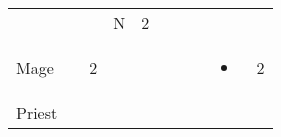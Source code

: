 \documentclass[12pt]{article}
\begin{document}
\begin{longtable}[]{@{}llllllllll@{}}
\begin{minipage}[t]{0.06\columnwidth}
\strut\end{minipage} &
\begin{minipage}[t]{0.06\columnwidth}\raggedright\strut
\strut\end{minipage} &
\begin{minipage}[t]{0.06\columnwidth}\raggedright\strut
\strut\end{minipage} &
\begin{minipage}[t]{0.07\columnwidth}\raggedright\strut
N
\strut\end{minipage} &
\begin{minipage}[t]{0.08\columnwidth}\raggedright\strut
2
\strut\end{minipage}\tabularnewline
\begin{minipage}[t]{0.13\columnwidth}\raggedright\strut
Mage
\strut\end{minipage} &
\begin{minipage}[t]{0.06\columnwidth}\raggedright\strut
\strut\end{minipage} &
\begin{minipage}[t]{0.06\columnwidth}\raggedright\strut
2
\strut\end{minipage} &
\begin{minipage}[t]{0.06\columnwidth}\raggedright\strut
\strut\end{minipage} &
\begin{minipage}[t]{0.06\columnwidth}\raggedright\strut
\strut\end{minipage} &
\begin{minipage}[t]{0.06\columnwidth}\raggedright\strut
\strut\end{minipage} &
\begin{minipage}[t]{0.06\columnwidth}\raggedright\strut
\strut\end{minipage} &
\begin{minipage}[t]{0.06\columnwidth}\raggedright\strut
\strut\end{minipage} &
\begin{minipage}[t]{0.07\columnwidth}\raggedright\strut
\begin{itemize}
\item
\end{itemize}
\strut\end{minipage} &
\begin{minipage}[t]{0.08\columnwidth}\raggedright\strut
2
\strut\end{minipage}\tabularnewline
\begin{minipage}[t]{0.13\columnwidth}\raggedright\strut
Priest
\strut\end{minipage} &

\end{longtable}
\end{document}
